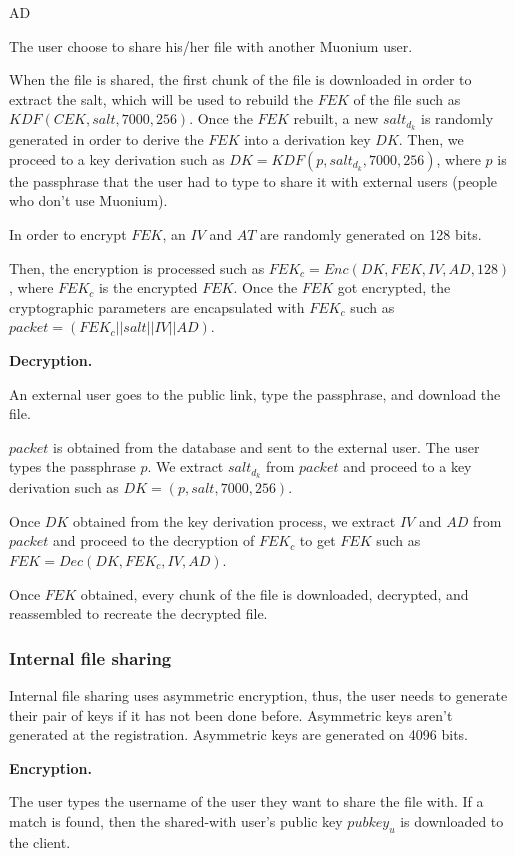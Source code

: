 AD\documentclass[a4paper,10pt]{article}
\begin{document}
The user choose to share his/her file with another Muonium user.

When the file is shared, the first chunk of the file is downloaded in order to extract the salt, which will
be used to rebuild the $FEK$ of the file such as $KDF(CEK, salt, 7000, 256)$. Once the $FEK$ rebuilt,
a new $salt_d_k$ is randomly generated in order to derive the $FEK$ into a derivation key $DK$. Then,
we proceed to a key derivation such as $DK=KDF(p, salt_d_k, 7000, 256)$, where $p$ is the passphrase
that the user had to type to share it with external users (people who don't use Muonium).

In order to encrypt $FEK$, an $IV$ and $AT$ are randomly generated on 128 bits.

Then, the encryption is processed such as $FEK_c=Enc(DK, FEK, IV, AD, 128)$, where $FEK_c$ is the
encrypted $FEK$. Once the $FEK$ got encrypted, the cryptographic parameters are encapsulated with
$FEK_c$ such as $packet=(FEK_c||salt||IV||AD)$.

\textbf{Decryption.}

An external user goes to the public link, type the passphrase, and download the file.

$packet$ is obtained from the database and sent to the external user. The user types the passphrase
$p$. We extract $salt_d_k$ from $packet$ and proceed to a key derivation such as $DK=(p, salt, 7000, 256)$.

Once $DK$ obtained from the key derivation process, we extract $IV$ and $AD$ from $packet$ and proceed to
the decryption of $FEK_c$ to get $FEK$ such as $FEK=Dec(DK, FEK_c, IV, AD)$.

Once $FEK$ obtained, every chunk of the file is downloaded, decrypted, and reassembled to recreate the
decrypted file.

\subsubsection{Internal file sharing}

Internal file sharing uses asymmetric encryption, thus, the user needs to generate their pair of
keys if it has not been done before. Asymmetric keys aren't generated at the registration. Asymmetric
keys are generated on 4096 bits.

\textbf{Encryption.}

The user types the username of the user they want to share the file with. If a match is found, then the
shared-with user's public key $pubkey_u$ is downloaded to the client.
\end{document}
